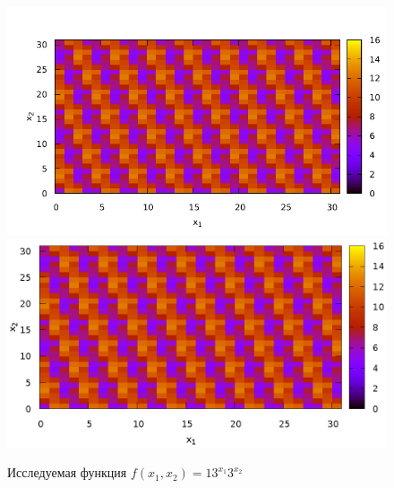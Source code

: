 \begin{figure}
\centering

\ifpdf
\includegraphics[angle=0]
{./part4/quantcomp/picdiscretlog0.pdf}
\else
\includegraphics[angle=0]
{./part4/quantcomp/picdiscretlog0.eps}
\fi
%

\caption{Исследуемая функция $f(x_1, x_2) = 13^{x_1}3^{x_2}$} 
\label{fig:part4:quantcomp:dl0}
\end{figure}
